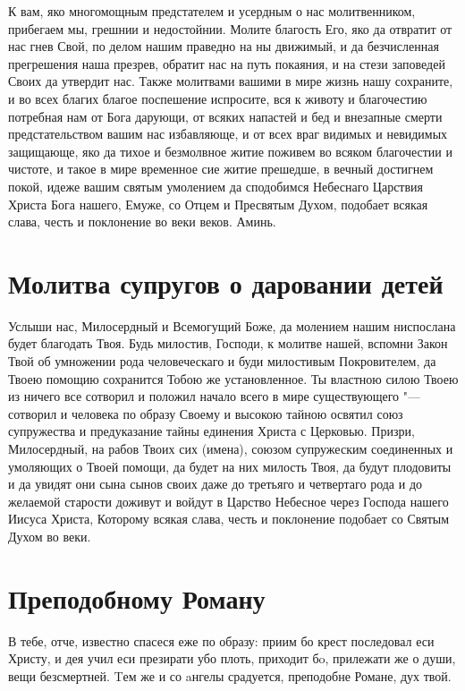 К вам, яко многомощным предстателем и усердным о нас молитвенником, прибегаем мы, грешнии и недостойнии. Молите благость Его, яко да отвратит от нас гнев Свой, по делом нашим праведно на ны движимый, и да безчисленная прегрешения наша презрев, обратит нас на путь покаяния, и на стези заповедей Своих да утвердит нас. Также молитвами вашими в мире жизнь нашу сохраните, и во всех благих благое поспешение испросите, вся к животу и благочестию потребная нам от Бога дарующи, от всяких напастей и бед и внезапные смерти предстательством вашим нас избавляюще, и от всех враг видимых и невидимых защищающе, яко да тихое и безмолвное житие поживем во всяком благочестии и чистоте, и такое в мире временное сие житие прешедше, в вечный достигнем покой, идеже вашим святым умолением да сподобимся Небеснаго Царствия Христа Бога нашего, Емуже, со Отцем и Пресвятым Духом, подобает всякая слава, честь и поклонение во веки веков. Аминь.

\section{Молитва супругов о даровании детей}
 


Услыши нас, Милосердный и Всемогущий Боже, да молением нашим ниспослана будет благодать Твоя. Будь милостив, Господи, к молитве нашей, вспомни Закон Твой об умножении рода человеческаго и буди милостивым Покровителем, да Твоею помощию сохранится Тобою же установленное. Ты властною силою Твоею из ничего все сотворил и положил начало всего в мире существующего "--- сотворил и человека по образу Своему и высокою тайною освятил союз супружества и предуказание тайны единения Христа с Церковью. Призри, Милосердный, на рабов Твоих сих (имена), союзом супружеским соединенных и умоляющих о Твоей помощи, да будет на них милость Твоя, да будут плодовиты и да увидят они сына сынов своих даже до третьяго и четвертаго рода и до желаемой старости доживут и войдут в Царство Небесное через Господа нашего Иисуса Христа, Которому всякая слава, честь и поклонение подобает со Святым Духом во веки. 


\section{Преподобному Роману}
 


В тебе, отче, известно спасеся еже по образу: приим бо крест последовал еси Христу,  и дея учил еси презирати убо плоть, приходит бo, прилежати же о души, вещи безсмертней. Tем же и со aнгелы срадуется, преподобне Романе, дух твой.


